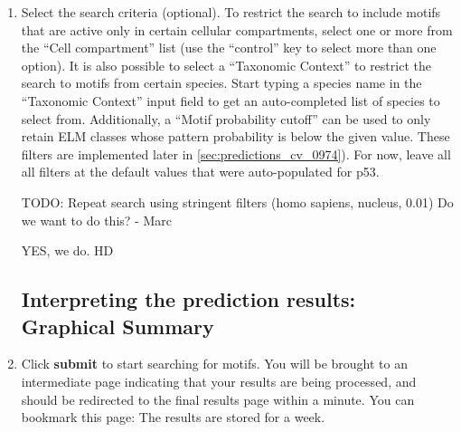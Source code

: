 \documentclass[12pt]{article}
\newcounter{proto}
\newcommand\button[1]{%
	\textbf{#1}%
}
\begin{document}
\begin{enumerate}
\item Select the search criteria (optional). 
	To restrict the search to include
	motifs that are active only in certain cellular compartments, select one or
	more from the ``Cell compartment'' list (use the ``control'' key to select more than one
	option). It is also possible to select a ``Taxonomic Context'' to
	restrict the search to motifs from certain species. Start typing a
	species name in the ``Taxonomic Context'' input field to get an
	auto-completed list of species to select from. Additionally, a ``Motif
	probability cutoff'' can be used to only retain ELM classes whose
	pattern probability is below the given value.
	These filters are implemented later in \ref{sec:predictions_cv_0974}).
	For now, leave all all filters at the default values that were
	auto-populated for p53. 



TODO: Repeat search using stringent filters (homo sapiens, nucleus, 0.01) Do we want to do this? - Marc

YES, we do. HD
%

%
%

\subsection*{Interpreting the prediction results: Graphical Summary}
\label{sec:predicting_p53_graphical_summary}

\item \label{sec:predicting_p53_submit} Click \button{submit} to start searching for motifs. You will be brought
	to an intermediate page indicating that your results are being
	processed, and should be redirected to the final results page
	within a minute. You can bookmark this page: The results are stored for
	a week.



\end{enumerate}
\end{document}
